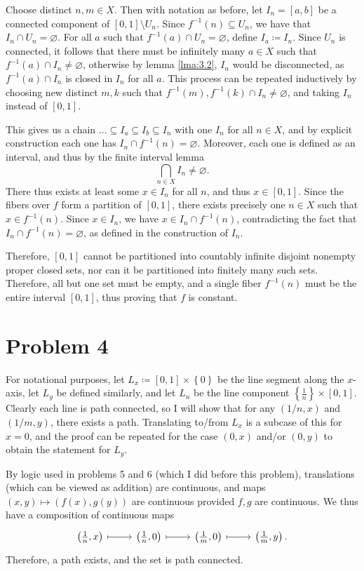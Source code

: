 \documentclass[11pt, letterpaper]{article}
\begin{document}
Choose distinct $n,m\in X$. Then with notation as before, let $I_n=[a,b]$ be a connected component of $[0,1]\setminus U_n$. Since $f^{-1} (n)\subseteq U_n$, we have that $I_n \cap U_n=\varnothing $. For all $a$ such that $f^{-1} (a)\cap U_n=\varnothing $, define $I_a\coloneqq I_n$. Since $U_n$ is connected, it follows that there must be infinitely many $a\in X$ such that $f^{-1} (a) \cap I_n\neq \varnothing $, otherwise by lemma \ref{lma:3.2}, $I_n$ would be disconnected, as $f^{-1} (a) \cap I_n$ is closed in $I_n$ for all $a$. This process can be repeated inductively by choosing new distinct $m,k$ such that $f^{-1} (m),f^{-1} (k) \cap I_n \neq \varnothing $, and taking $I_n$ instead of $[0,1]$.

This gives us a chain $\ldots \subseteq I_a\subseteq I_b\subseteq I_n$ with one $I_n$ for all $n\in X$, and by explicit construction each one has $I_n \cap f^{-1} (n)=\varnothing $. Moreover, each one is defined as an interval, and thus by the finite interval lemma
\[
	\bigcap_{n\in X} I_n\neq \varnothing 
.\]
There thus exists at least some $x\in I_n$ for all $n$, and thus $x\in [0,1]$. Since the fibers over $f$ form a partition of $[0,1]$, there exists precisely one $n\in X$ such that $x\in f^{-1} (n)$. Since $x\in I_n$, we have $x\in I_n \cap f^{-1} (n)$, contradicting the fact that $I_n \cap f^{-1} (n)=\varnothing $, as defined in the construction of $I_n$.

Therefore, $[0,1]$ cannot be partitioned into countably infinite disjoint nonempty proper closed sets, nor can it be partitioned into finitely many such sets. Therefore, all but one set must be empty, and a single fiber $f^{-1} (n)$ must be the entire interval $[0,1]$, thus proving that $f$ is constant.
\section*{Problem 4}
For notational purposes, let $L_x\coloneqq [0,1]\times \left\{ 0 \right\} $ be the line segment along the $x$-axis, let $L_y$ be defined similarly, and let $L_n$ be the line component $\left\{ \frac{1}{n}  \right\} \times [0,1]$. Clearly each line is path connected, so I will show that for any $(1/n,x)$ and $(1/m,y)$, there exists a path. Translating to/from $L_x$ is a subcase of this for $x=0$, and the proof can be repeated for the case $(0,x)$ and/or $(0,y)$ to obtain the statement for $L_y$.

By logic used in problems 5 and 6 (which I did before this problem), translations (which can be viewed as addition) are continuous, and maps $(x,y)\mapsto (f(x),g(y))$ are continuous provided $f,g$ are continuous. We thus have a composition of continuous maps
\[\begin{tikzcd}[row sep = 2.5em, column sep = 2.5em]
	\left( \frac{1}{n} ,x \right) \ar[r, mapsto]&\left( \frac{1}{n},0  \right) \ar[r, mapsto]&\left( \frac{1}{m} ,0 \right) \ar[r, mapsto]&\left( \frac{1}{m} ,y \right) .
\end{tikzcd}\]
Therefore, a path exists, and the set is path connected.
\end{document}
